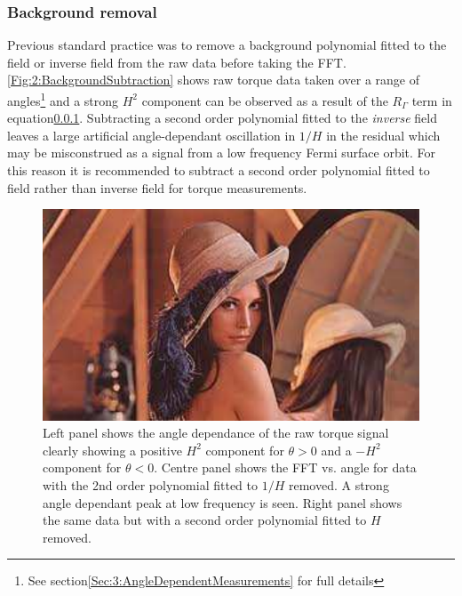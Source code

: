 \subsubsection{Background removal}
Previous standard practice was to remove a background polynomial fitted to the field or inverse field from the raw data before taking the FFT. \Fig\ref{Fig:2:BackgroundSubtraction} shows raw torque data taken over a range of angles\footnote{See section\ref{Sec:3:AngleDependentMeasurements} for full details} and a strong $H^2$ component can be observed as a result of the $R_{\Gamma}$ term in equation\ref{}. Subtracting a second order polynomial fitted to the \textit{inverse} field leaves a large artificial angle-dependant oscillation in $1/H$ in the residual which may be misconstrued as a signal from a low frequency Fermi surface orbit. For this reason it is recommended to subtract a second order polynomial fitted to field rather than inverse field for torque measurements.
\begin{figure}[h!]
    \begin{center}
        \includegraphics[scale=0.7]{Misc/TODO}
        \caption{Left panel shows the angle dependance of the raw torque signal  clearly showing a positive $H^2$ component for $\theta>0$ and a $-H^2$ component for $\theta<0$. Centre panel shows the FFT vs. angle for data with the 2nd order polynomial fitted to $1/H$ removed. A strong angle dependant peak at low frequency is seen. Right panel shows the same data but with a second order polynomial fitted to $H$ removed.}
        \label{Fig:2:BackgroundSubstraction}
    \end{center}
\end{figure}



